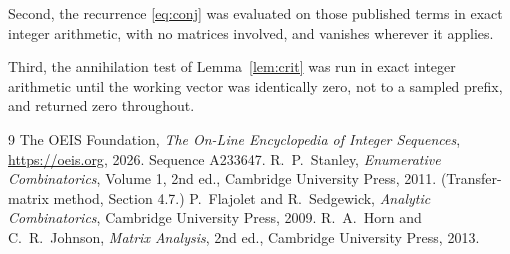 \documentclass[11pt,a4paper]{article}
\theoremstyle{plain}
\theoremstyle{definition}
\begin{document}
Second, the recurrence \eqref{eq:conj} was evaluated on those published terms in exact
integer arithmetic, with no matrices involved, and vanishes wherever it applies.

Third, the annihilation test of Lemma~\ref{lem:crit} was run in exact integer arithmetic
until the working vector was identically zero, not to a sampled prefix, and returned zero
throughout.

\begin{thebibliography}{9}
 The OEIS Foundation, \emph{The On-Line Encyclopedia of Integer
Sequences}, \url{https://oeis.org}, 2026. Sequence A233647.
 R.~P.~Stanley, \emph{Enumerative Combinatorics}, Volume 1, 2nd ed.,
Cambridge University Press, 2011. (Transfer-matrix method, Section 4.7.)
 P.~Flajolet and R.~Sedgewick, \emph{Analytic Combinatorics}, Cambridge
University Press, 2009.
 R.~A.~Horn and C.~R.~Johnson, \emph{Matrix Analysis}, 2nd ed., Cambridge
University Press, 2013.
\end{thebibliography}
\end{document}
